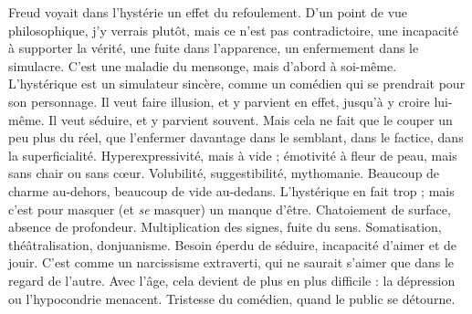 Freud voyait dans l’hystérie un effet du refoulement. D’un point de vue
philosophique, j’y verrais plutôt, mais ce n’est pas contradictoire, une incapacité
à supporter la vérité, une fuite dans l’apparence, un enfermement dans le
simulacre. C’est une maladie du mensonge, mais d’abord à soi-même. L’hystérique
est un simulateur sincère, comme un comédien qui se prendrait pour son
personnage. Il veut faire illusion, et y parvient en effet, jusqu’à y croire lui-même.
Il veut séduire, et y parvient souvent. Mais cela ne fait que le couper un
peu plus du réel, que l’enfermer davantage dans le semblant, dans le factice,
dans la superficialité. Hyperexpressivité, mais à vide ; émotivité à fleur de peau,
mais sans chair ou sans cœur. Volubilité, suggestibilité, mythomanie. Beaucoup
de charme au-dehors, beaucoup de vide au-dedans. L’hystérique en fait
trop ; mais c’est pour masquer (et {\it se} masquer) un manque d’être. Chatoiement
de surface, absence de profondeur. Multiplication des signes, fuite du sens.
Somatisation, théâtralisation, donjuanisme. Besoin éperdu de séduire, incapacité
d’aimer et de jouir. C’est comme un narcissisme extraverti, qui ne saurait
s'aimer que dans le regard de l’autre. Avec l’âge, cela devient de plus en plus
difficile : la dépression ou l’hypocondrie menacent. Tristesse du comédien,
quand le public se détourne.

